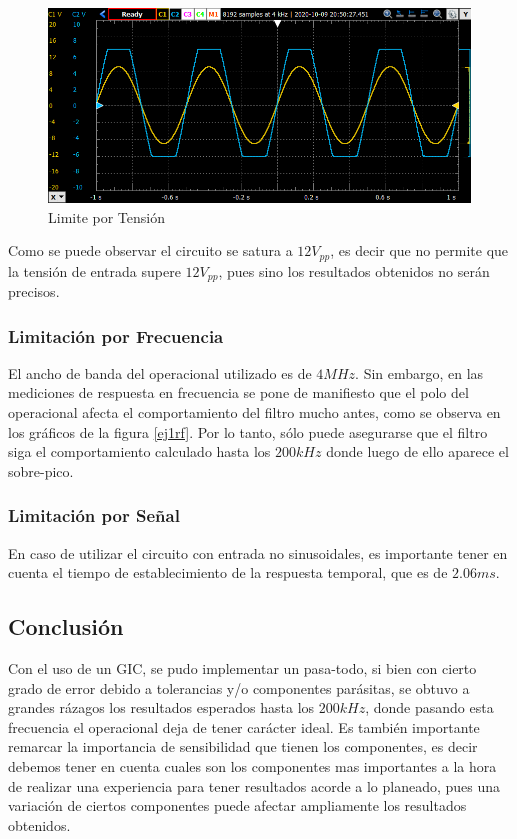 \begin{figure}[H]
    \centering
    \includegraphics[scale = 0.8]{../Ejercicio1-FiltroConGIC/Informe/limtensionpng.png}
    \caption{Limite por Tensión}
    \label{ej1limt}
\end{figure}

Como se puede observar el circuito se satura a $12V_{pp}$, es decir que no permite que la tensión de entrada supere $12V_{pp}$, pues sino los resultados obtenidos no serán precisos.

\subsubsection{Limitación por Frecuencia}

El ancho de banda del operacional utilizado es de $4MHz$. Sin embargo, en las mediciones de respuesta en frecuencia se pone de manifiesto que el polo del operacional afecta el comportamiento del filtro mucho antes, como se observa en los gr\'aficos de la figura \ref{ej1rf}. Por lo tanto, s\'olo puede asegurarse que el filtro siga el comportamiento calculado hasta los $200kHz$ donde luego de ello aparece el sobre-pico.

\subsubsection{Limitación por Señal}

En caso de utilizar el circuito con entrada no sinusoidales, es importante tener en cuenta el tiempo de establecimiento de la respuesta temporal, que es de $2.06ms$. 

\subsection{Conclusión}

Con el uso de un GIC, se pudo implementar un pasa-todo, si bien con cierto grado de error debido a tolerancias y/o componentes parásitas, se obtuvo a grandes rázagos los resultados esperados hasta los $200kHz$, donde pasando esta frecuencia el operacional deja de tener carácter ideal. Es también importante remarcar la importancia de sensibilidad que tienen los componentes, es decir debemos tener en cuenta cuales son los componentes mas importantes a la hora de realizar una experiencia para tener resultados acorde a lo planeado, pues una variación de ciertos componentes puede afectar ampliamente los resultados obtenidos. 